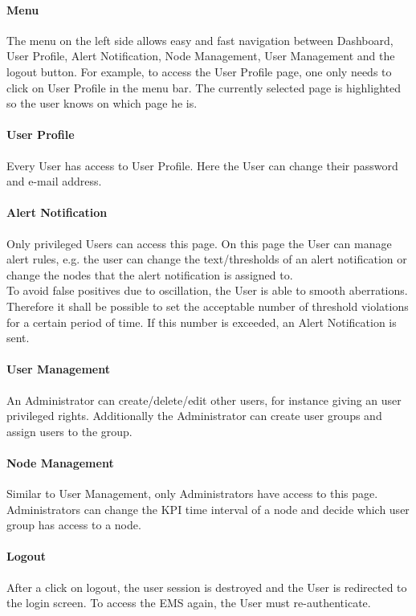 \documentclass{scrreprt}
\begin{document}
\paragraph{Menu}
The menu on the left side allows easy and fast navigation between Dashboard, User Profile, Alert Notification, Node Management, User Management and the logout button.
For example, to access the User Profile page, one only needs to click on User Profile in the menu bar.
The currently selected page is highlighted so the user knows on which page he is.

\paragraph{User Profile}
Every User has access to User Profile. Here the User can change their password and e-mail address.

\paragraph{Alert Notification}
Only privileged Users can access this page. On this page the User can manage alert rules, e.g. the user can change the text/thresholds of an alert notification or change the nodes that the alert notification is assigned to.\\
To avoid false positives due to oscillation, the User is able to smooth aberrations. Therefore it shall be possible to set the acceptable number of threshold violations for a certain period of time. If this number is exceeded, an Alert Notification is sent.

\paragraph{User Management}
An Administrator can create/delete/edit other users, for instance giving an user privileged rights.
Additionally the Administrator can create user groups and assign users to the group.

\paragraph{Node Management}
Similar to User Management, only Administrators have access to this page. Administrators can change the KPI time interval of a node
and decide which user group has access to a node.

\paragraph{Logout}
After a click on logout, the user session is destroyed and the User is redirected to the login
screen. To access the EMS again, the User must re-authenticate.
\end{document}
